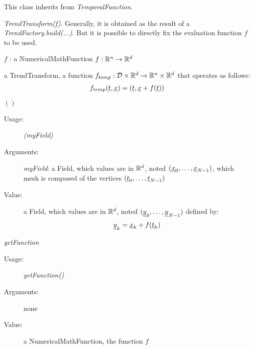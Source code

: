 This class inherits from \textit{TemporalFunction}.

\begin{description}

\item[Usage:] \textit{TrendTransform(f)}. Generally, it is obtained as the result of a \textit{TrendFactory.build(...)}. But it is possible to directly fix the evaluation function $f$ to be used.
\bigskip

\item[Arguments:]  \rule{0pt}{1em}
\begin{description}
\item $f$ : a NumericalMathFunction $f: {\mathbb R}^n \rightarrow {\mathbb R}^d$
\end{description}
\bigskip

\item[Value:] a TrendTransform, a function $f_{temp}: {\mathcal D}\times {\mathbb R}^d \rightarrow {\mathbb R}^n \times {\mathbb R}^d$ that operates as follows:
\begin{align}\label{trendTempFunc}
f_{temp}({\underline{t}}, {\underline{x}})=({\underline{t}},  {\underline{x}} +  f({\underline{t}}))
\end{align}


\bigskip

\item[Some methods :]  \rule{0pt}{1em}

\begin{description}

\item $()$
\begin{description}
\item[Usage:] \textit{(myField)}
\item[Arguments:] \textit{myField}: a Field, which values are in ${\mathbb R}^d$, noted  $({\underline{x}}_0, \dots, {\underline{x}}_{N-1})$, which mesh is composed of the vertices $({\underline{t}}_0, \dots, {\underline{t}}_{N-1})$
\item[Value:]   a Field, which values are in ${\mathbb R}^d$, noted  $({\underline{y}}_0, \dots, {\underline{y}}_{N-1})$ defined by:
\begin{equation}
{\underline{y}}_k = {\underline{x}}_k + f({\underline{t}}_k)
\end{equation}
\end{description}
\bigskip

\item \textit{getFunction}
\begin{description}
\item[Usage:] \textit{getFunction()}
\item[Arguments:] none
\item[Value:]  a NumericalMathFunction, the function $f$
\end{description}
\bigskip


\end{description}
\end{description}
